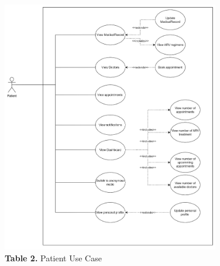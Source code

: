 \documentclass[12pt,a4paper]{article}
\begin{document}
\begin{figure}[H]
    \centering
    \includegraphics[width=0.85\textwidth]{diagrams/Picture/Usecase2.png}
    \caption*{\textbf{Table 2.} Patient Use Case}
\end{figure}
\end{document}
